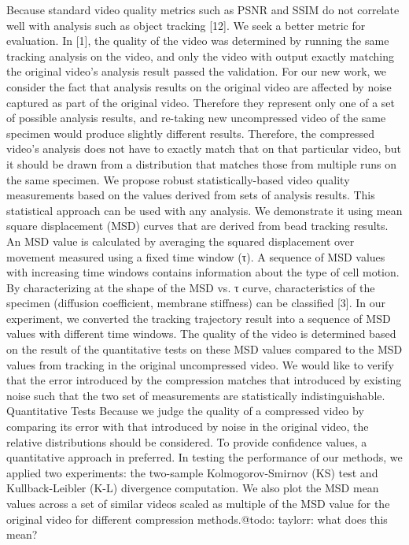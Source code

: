 Because standard video quality metrics such as PSNR and SSIM do not correlate well with analysis such as object tracking [12]. We seek a better metric for evaluation. In [1], the quality of the video was determined by running the same tracking analysis on the video, and only the video with output exactly matching the original video’s analysis result passed the validation. For our new work, we consider the fact that analysis results on the original video are affected by noise captured as part of the original video. Therefore they represent only one of a set of possible analysis results, and re-taking new uncompressed video of the same specimen would produce slightly different results. Therefore, the compressed video’s analysis does not have to exactly match that on that particular video, but it should be drawn from a distribution that matches those from multiple runs on the same specimen. We propose robust statistically-based video quality measurements based on the values derived from sets of analysis results.
This statistical approach can be used with any analysis. We demonstrate it using mean square displacement (MSD) curves that are derived from bead tracking results. An MSD value is calculated by averaging the squared displacement over movement measured using a fixed time window (τ).  A sequence of MSD values with increasing time windows contains information about the type of cell motion. By characterizing at the shape of the MSD vs. τ curve, characteristics of the specimen (diffusion coefficient, membrane stiffness) can be classified [3].
In our experiment, we converted the tracking trajectory result into a sequence of MSD values with different time windows. The quality of the video is determined based on the result of the quantitative tests on these MSD values compared to the MSD values from tracking in the original uncompressed video. We would like to verify that the error introduced by the compression matches that introduced by existing noise such that the two set of measurements are statistically indistinguishable.
Quantitative Tests
Because we judge the quality of a compressed video by comparing its error with that introduced by noise in the original video, the relative distributions should be considered. To provide confidence values, a quantitative approach in preferred. In testing the performance of our methods, we applied two experiments: the two-sample Kolmogorov-Smirnov (KS) test and Kullback-Leibler (K-L) divergence computation. We also plot the MSD mean values across a set of similar videos scaled as multiple of the MSD value for the original video for different compression methods.@todo: taylorr: what does this mean?

